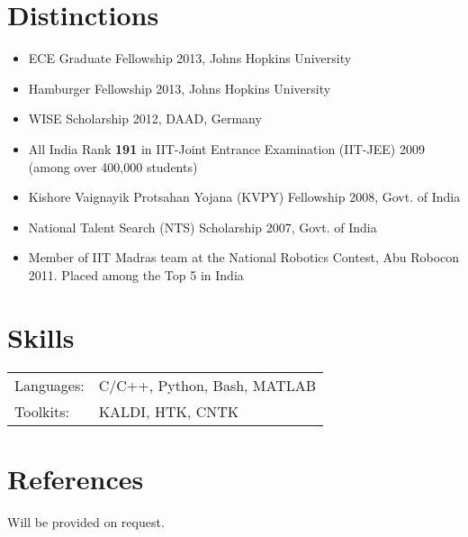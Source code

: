 \documentclass[margin,line,pifont,palatino,courier]{res}
\begin{document}
\begin{resume}
\section{\sc Distinctions}
\begin{itemize} \itemsep -2pt
    \item ECE Graduate Fellowship 2013, Johns Hopkins University
    \item Hamburger Fellowship 2013, Johns Hopkins University
    \item WISE Scholarship 2012, DAAD, Germany
    \item All India Rank \textbf{191} in {IIT-Joint Entrance Examination (IIT-JEE)} 2009 (among over 400,000 students) 
    \item Kishore Vaignayik Protsahan Yojana (KVPY) Fellowship 2008, Govt. of India %
    \item National Talent Search (NTS) Scholarship 2007, Govt. of India %
    \item Member of IIT Madras team at the National Robotics Contest, Abu Robocon 2011. Placed among the Top 5 in India
  \end{itemize}

\section{\sc Skills}

\begin{tabular}{@{}p{0.8in}p{6in}}

Languages:& C/C++, Python, Bash, MATLAB\\
Toolkits: & KALDI, HTK, CNTK \\

\end{tabular}

\section{\sc References}

Will be provided on request.

\end{resume}
\end{document}
